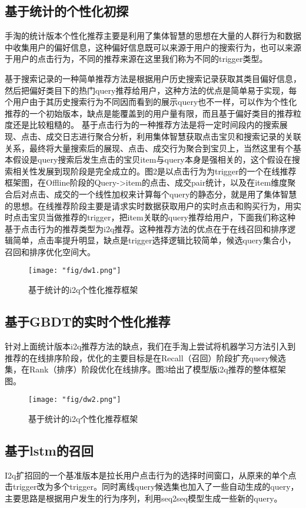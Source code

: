 \subsection{基于统计的个性化初探}	
手淘的统计版本个性化推荐主要是利用了集体智慧的思想在大量的人群行为和数据中收集用户的偏好信息，这种偏好信息既可以来源于用户的搜索行为，也可以来源于用户的点击行为，不同的推荐来源在这里我们称为不同的trigger类型。
\par 基于搜索记录的一种简单推荐方法是根据用户历史搜索记录获取其类目偏好信息，然后把偏好类目下的热门query推荐给用户，这种方法的优点是简单易于实现，每个用户由于其历史搜索行为不同因而看到的展示query也不一样，可以作为个性化推荐的一个初始版本，缺点是能覆盖到的用户量有限，而且基于偏好类目的推荐粒度还是比较粗糙的。
基于点击行为的一种推荐方法是将一定时间段内的搜索展现、点击、成交日志进行聚合分析，利用集体智慧获取点击宝贝和搜索记录的关联关系，最终将大量搜索后的展现、点击、成交行为聚合到宝贝上，当然这里有个基本假设是query搜索后发生点击的宝贝item与query本身是强相关的，这个假设在搜索相关性发展到现阶段是完全成立的。图2是以点击行为为trigger的一个在线推荐框架图，在Offline阶段的Query->item的点击、成交pair统计，以及在item维度聚合后对点击、成交的一个线性加权来计算每个query的静态分，就是用了集体智慧的思想。在线推荐阶段主要是请求实时数据获取用户的实时点击和购买行为，用实时点击宝贝当做推荐的trigger，把item关联的query推荐给用户，下面我们称这种基于点击行为的推荐类型为i2q推荐。这种推荐方法的优点在于在线召回和排序逻辑简单，点击率提升明显，缺点是trigger选择逻辑比较简单，候选query集合小，召回和排序优化空间大。
\begin{figure}[!h]
	\centering
	\texttt{[image: "fig/dw1.png"]}
	\caption{基于统计的i2q个性化推荐框架}
	\label{fig:dw1}
\end{figure}
\subsection{基于GBDT的实时个性化推荐}
针对上面统计版本i2q推荐方法的缺点，我们在手淘上尝试将机器学习方法引入到推荐的在线排序阶段，优化的主要目标是在Recall（召回）阶段扩充query候选集，在Rank（排序）阶段优化在线排序。图3给出了模型版i2q推荐的整体框架图。

\begin{figure}[!h]
	\centering
	\texttt{[image: "fig/dw2.png"]}
	\caption{基于统计的i2q个性化推荐框架}
	\label{fig:dw2}
\end{figure}

\subsection{基于lstm的召回}
I2q扩招回的一个基准版本是拉长用户点击行为的选择时间窗口，从原来的单个点击trigger改为多个trigger。同时离线query候选集也加入了一些自动生成的query，主要思路是根据用户发生的行为序列，利用seq2seq模型生成一些新的query。

